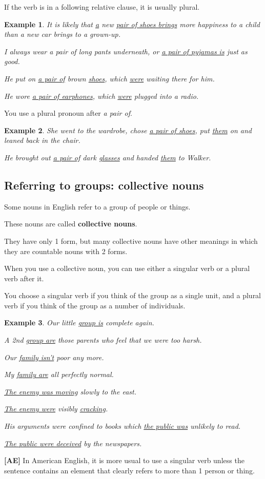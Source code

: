 \documentclass[oneside]{book}
\numberwithin{equation}{section}
\newtheorem{example}{Example}[section]
\begin{document}
If the verb is in a following relative clause, it is usually plural.
\begin{example}
    It is likely that \underline{a} new \underline{pair of shoes brings} more happiness to a child than a new car brings to a grown-up.
    
    I always wear a pair of long pants underneath, or \underline{a pair of pyjamas is} just as good.
    
    He put on \underline{a pair of} brown \underline{shoes}, which \underline{were} waiting there for him.
    
    He wore \underline{a pair of earphones}, which \underline{were} plugged into a radio.
\end{example}
You use a plural pronoun after \textit{a pair of}.
\begin{example}
    She went to the wardrobe, chose \underline{a pair of shoes}, put \underline{them} on and leaned back in the chair.
    
    He brought out \underline{a pair of} dark \underline{glasses} and handed \underline{them} to Walker.
\end{example}

\subsection{Referring to groups: collective nouns}
\noindent{} Some nouns in English refer to a group of people or things.

These nouns are called \textbf{collective nouns}.

They have only 1 form, but many collective nouns have other meanings in which they are countable nouns with 2 forms.

%
\noindent{} When you use a collective noun, you can use either a singular verb or a plural verb after it.

%
You choose a singular verb if you think of the group as a single unit, and a plural verb if you think of the group as a number of individuals.
\begin{example}
    Our little \underline{group is} complete again.
    
    A 2nd \underline{group are} those parents who feel that we were too harsh.
    
    Our \underline{family isn't} poor any more.
    
    My \underline{family are} all perfectly normal.
    
    \underline{The enemy was moving} slowly to the east.
    
    \underline{The enemy were} visibly \underline{cracking}.
    
    His arguments were confined to books which \underline{the public was} unlikely to read.
    
    \underline{The public were deceived} by the newspapers.
\end{example}
\textbf{[AE]} In American English, it is more usual to use a singular verb unless the sentence contains an element that clearly refers to more than 1 person or thing.
\end{document}

